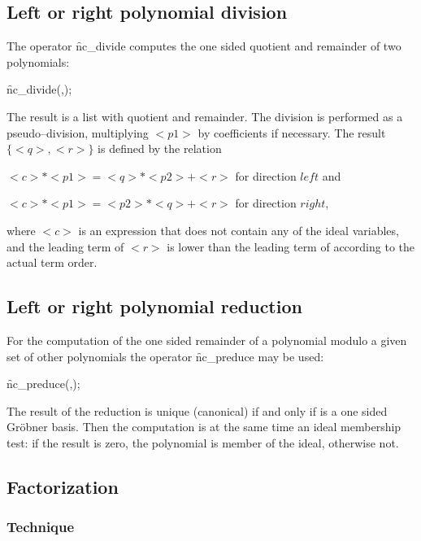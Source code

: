 \subsection{Left or right polynomial division}

\hypertarget{operator:NC_DIVIDE}{}
The operator \f{nc\_divide} computes the one sided quotient and remainder of
two polynomials:
\begin{syntax}
    \f{nc\_divide}(,);
\end{syntax}
The result is a list with quotient and remainder.
The division is performed as a pseudo--division, multiplying
$<p1>$ by coefficients if necessary. The result $\{<q>,<r>\}$
is defined by the relation

  $<c>*<p1>=<q>*<p2> + <r>$ for direction $left$ and

  $<c>*<p1>=<p2>*<q> + <r>$ for direction $right$,

where $<c>$ is an expression that does not contain any of the
ideal variables, and the leading term of $<r>$ is lower than
the leading term of  according to the actual term order.

\subsection{Left or right polynomial reduction}

\hypertarget{operator:NC_PREDUCE}{}
For the computation of the one sided remainder of a polynomial
modulo a given set of other polynomials the operator
\f{nc\_preduce} may be used:
\begin{syntax}
    \f{nc\_preduce}(,);
\end{syntax}
The result of the reduction is unique (canonical) if
and only if  is a one sided Gr\"obner basis.
Then the computation is at the same time an ideal
membership test: if the result is zero, the
polynomial is member of the ideal, otherwise not.

\subsection{Factorization}

\subsubsection{Technique}

